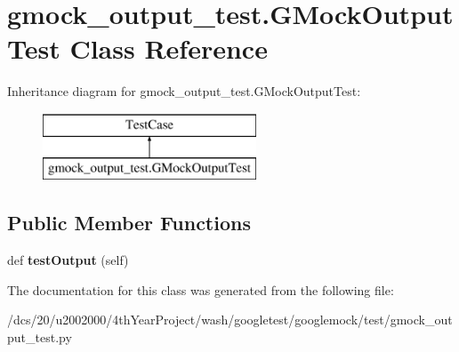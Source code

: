 \hypertarget{classgmock__output__test_1_1GMockOutputTest}{}\section{gmock\+\_\+output\+\_\+test.\+G\+Mock\+Output\+Test Class Reference}
\label{classgmock__output__test_1_1GMockOutputTest}
Inheritance diagram for gmock\+\_\+output\+\_\+test.\+G\+Mock\+Output\+Test\+:\begin{figure}[H]
\begin{center}
\leavevmode
\includegraphics[height=2.000000cm]{classgmock__output__test_1_1GMockOutputTest}
\end{center}
\end{figure}
\subsection*{Public Member Functions}
\begin{DoxyCompactItemize}
\item 
\mbox{\label{classgmock__output__test_1_1GMockOutputTest_a661e7846690f48328fd9e0834fde9980}} 
def {\bfseries test\+Output} (self)
\end{DoxyCompactItemize}


The documentation for this class was generated from the following file\+:\begin{DoxyCompactItemize}
\item 
/dcs/20/u2002000/4th\+Year\+Project/wash/googletest/googlemock/test/gmock\+\_\+output\+\_\+test.\+py\end{DoxyCompactItemize}
